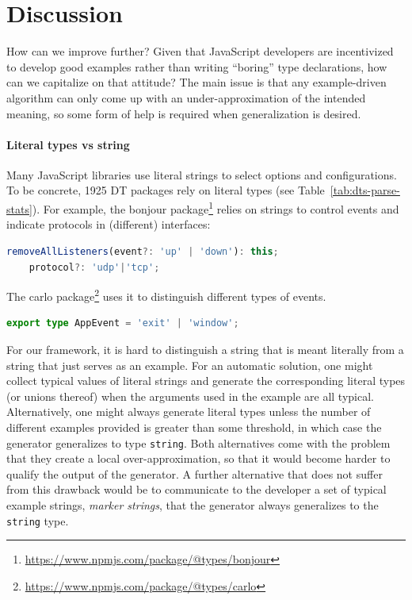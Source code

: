 \documentclass[sigconf]{acmart}
\begin{document}
\section{Discussion}
\label{sec:discussion}

How can we improve further? Given that JavaScript developers are incentivized to develop good
examples rather than writing ``boring'' type declarations, how can we capitalize on that attitude?
The main issue is that any example-driven algorithm can only come up with an
under-approximation of the intended meaning, so some form of help is required when
generalization is desired.

\paragraph*{Literal types vs string}
Many JavaScript libraries use literal strings to select
options and configurations. To be concrete, 1925 DT packages rely on
literal types (see Table~\ref{tab:dts-parse-stats}). For example, the bonjour
package\footnote{\url{https://www.npmjs.com/package/@types/bonjour}}
relies on strings to control events and indicate protocols in (different) interfaces:
\begin{lstlisting}[language=TypeScript]
    removeAllListeners(event?: 'up' | 'down'): this;
    protocol?: 'udp'|'tcp';
\end{lstlisting}
The carlo
package\footnote{\url{https://www.npmjs.com/package/@types/carlo}}
uses it to distinguish different 
types of events.
\begin{lstlisting}[language=TypeScript]
export type AppEvent = 'exit' | 'window';
\end{lstlisting}

For our framework, it is hard to distinguish a string that is meant literally from a
string that just serves as an example. For an automatic solution, one might collect
typical values of literal strings and generate the corresponding literal types (or
unions thereof) when the arguments used in the example are all typical. Alternatively, one
might always generate literal types unless the number of different examples provided is
greater than some threshold, in which case the generator generalizes to type
\lstinline/string/. Both alternatives come with the problem that they
create a local over-approximation, so that it would become harder to
qualify the output of the generator. A further alternative that does
not suffer from this drawback would be to communicate to the developer a set
of typical example strings, \emph{marker strings}, that the generator
always generalizes to the \lstinline/string/ type.
\end{document}
